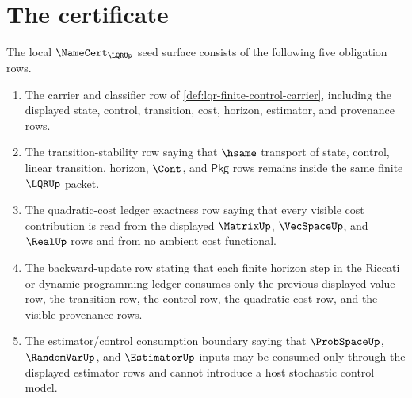 \section{The certificate}
\label{sec:lqr-certificate}

\begin{theorem}
\label{thm:lqr-namecert-seed-obligation-surface}
The local $\NameCert_{\LQRUp}$ seed surface consists of the following five obligation rows.

\begin{enumerate}
\item The carrier and classifier row of \autoref{def:lqr-finite-control-carrier}, including the displayed state, control, transition, cost, horizon, estimator, and provenance rows.

\item The transition-stability row saying that $\hsame$ transport of state, control, linear transition, horizon, $\Cont$, and $\mathsf{Pkg}$ rows remains inside the same finite $\LQRUp$ packet.

\item The quadratic-cost ledger exactness row saying that every visible cost contribution is read from the displayed $\MatrixUp$, $\VecSpaceUp$, and $\RealUp$ rows and from no ambient cost functional.

\item The backward-update row stating that each finite horizon step in the Riccati or dynamic-programming ledger consumes only the previous displayed value row, the transition row, the control row, the quadratic cost row, and the visible provenance rows.

\item The estimator/control consumption boundary saying that $\ProbSpaceUp$, $\RandomVarUp$, and $\EstimatorUp$ inputs may be consumed only through the displayed estimator rows and cannot introduce a host stochastic control model.
\end{enumerate}
\end{theorem}
